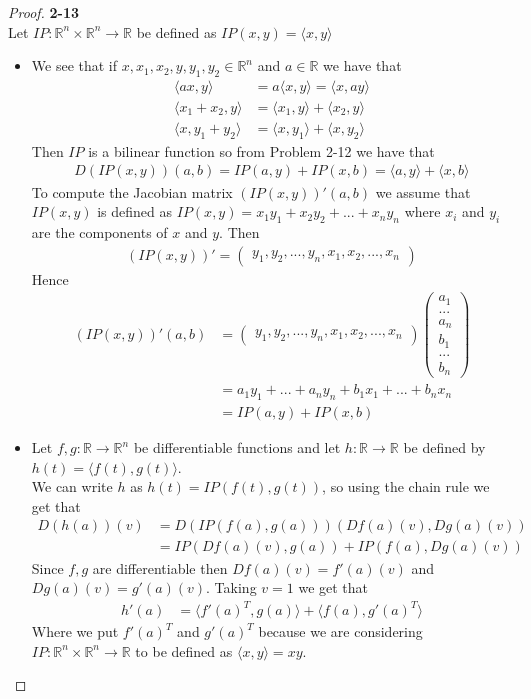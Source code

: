 \documentclass[11pt]{article}
\newcommand{\R}{\mathbb{R}}
\newcommand{\inprd}[1]{\langle #1\rangle}
\theoremstyle{definition}
\begin{document}
\cleardoublepage
\begin{proof}{\textbf{2-13}}\\
Let $IP:\R^n \times \R^n \to \R$ be defined as $IP(x,y)= \inprd{x,y}$
\begin{itemize}
\item [(a)] We see that if $x, x_1, x_2, y, y_1, y_2 \in \R^n$ and $a \in \R$
we have that
\begin{align*}
    \inprd{ax,y} &= a\inprd{x,y} = \inprd{x,ay}\\
    \inprd{x_1 + x_2,y} &= \inprd{x_1, y} + \inprd{x_2, y}\\
    \inprd{x,y_1 + y_2} &= \inprd{x, y_1} + \inprd{x, y_2}
\end{align*}
Then $IP$ is a bilinear function so from Problem 2-12 we have that
\begin{align*}
    D(IP(x,y))(a,b) = IP(a, y) + IP(x, b) = \inprd{a,y} + \inprd{x,b}
\end{align*}
To compute the Jacobian matrix $(IP(x,y))'(a,b)$ we assume that $IP(x,y)$ is
defined as $IP(x,y) = x_1y_1 + x_2y_2 + ... + x_ny_n$ where $x_i$ and $y_i$ are
the components of $x$ and $y$. Then 
\begin{align*}
    (IP(x,y))' = \begin{pmatrix}
        y_1, y_2, ..., y_n, x_1, x_2, ..., x_n
    \end{pmatrix}
\end{align*}
Hence
\begin{align*}
    (IP(x,y))'(a,b) &= \begin{pmatrix}
        y_1, y_2, ..., y_n, x_1, x_2, ..., x_n
    \end{pmatrix}
    \begin{pmatrix}
        a_1\\ ...\\ a_n\\ b_1\\ ...\\ b_n
    \end{pmatrix}\\
    &= a_1y_1 + ... + a_ny_n + b_1x_1 + ... + b_nx_n\\
    &= IP(a, y) + IP(x, b)
\end{align*}

\item [(b)] Let $f,g:\R \to \R^n$ be differentiable functions and let
$h:\R\to \R$ be defined by $h(t) = \inprd{f(t), g(t)}$.
\\
We can write $h$ as $h(t) = IP(f(t), g(t))$, so using the chain rule we get
that
\begin{align*}
    D(h(a))(v) &= D(IP(f(a),g(a)))(Df(a)(v), Dg(a)(v))\\
    &= IP(Df(a)(v),g(a)) + IP(f(a),Dg(a)(v))
\end{align*}
Since $f,g$ are differentiable then $Df(a)(v) = f'(a)(v)$ and
$Dg(a)(v) = g'(a)(v)$. Taking $v = 1$ we get that
\begin{align*}
    h'(a) &= \inprd{f'(a)^T, g(a)} + \inprd{f(a), g'(a)^T}
\end{align*}
Where we put $f'(a)^T$ and $g'(a)^T$ because we are considering
$IP: \R^n \times \R^n \to \R$ to be defined as $\inprd{x,y} = xy$.


\end{itemize}
\end{proof}
\end{document}

